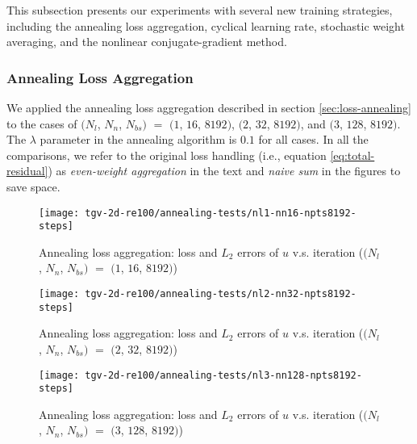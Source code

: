 This subsection presents our experiments with several new training strategies, including the annealing loss aggregation, cyclical learning rate, stochastic weight averaging, and the nonlinear conjugate-gradient method.

\subsubsection{Annealing Loss Aggregation}

We applied the annealing loss aggregation described in section \ref{sec:loss-annealing} to the cases of $(N_l$, $N_n$, $N_{bs})$ $=$ $(1$, $16$, $8192)$, $(2$, $32$, $8192)$, and $(3$, $128$, $8192)$.
The $\lambda$ parameter in the annealing algorithm is $0.1$ for all cases.
In all the comparisons, we refer to the original loss handling (i.e., equation \eqref{eq:total-residual}) as {\it even-weight aggregation} in the text and {\it naive sum} in the figures to save space.

\begin{figure}[hbt!]
    \centering%
    \texttt{[image: tgv-2d-re100/annealing-tests/nl1-nn16-npts8192-steps]}%
    \caption[%
        Annealing loss aggregation: loss and $L_2$ errors of $u$ v.s. iteration ($(N_l$, $N_n$, $N_{bs})$ $=$ $(1$, $16$, $8192)$)%
    ]{%
        Annealing loss aggregation: loss and $L_2$ errors of $u$ v.s. iteration ($(N_l$, $N_n$, $N_{bs})$ $=$ $(1$, $16$, $8192)$)%
    }\label{fig:annealing-tests-nl1-nn16-npts8192-steps}%
\end{figure}

\begin{figure}[hbt!]
    \centering%
    \texttt{[image: tgv-2d-re100/annealing-tests/nl2-nn32-npts8192-steps]}%
    \caption[%
        Annealing loss aggregation: loss and $L_2$ errors of $u$ v.s. iteration ($(N_l$, $N_n$, $N_{bs})$ $=$ $(2$, $32$, $8192)$)%
    ]{%
        Annealing loss aggregation: loss and $L_2$ errors of $u$ v.s. iteration ($(N_l$, $N_n$, $N_{bs})$ $=$ $(2$, $32$, $8192)$)%
    }\label{fig:annealing-tests-nl2-nn32-npts8192-steps}%
\end{figure}

\begin{figure}[hbt!]
    \centering%
    \texttt{[image: tgv-2d-re100/annealing-tests/nl3-nn128-npts8192-steps]}%
    \caption[%
        Annealing loss aggregation: loss and $L_2$ errors of $u$ v.s. iteration ($(N_l$, $N_n$, $N_{bs})$ $=$ $(3$, $128$, $8192)$)%
    ]{%
        Annealing loss aggregation: loss and $L_2$ errors of $u$ v.s. iteration ($(N_l$, $N_n$, $N_{bs})$ $=$ $(3$, $128$, $8192)$)%
    }\label{fig:annealing-tests-nl3-nn128-npts8192-steps}%
\end{figure}

